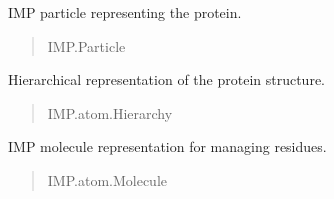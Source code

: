 \documentclass[letterpaper,10pt,english]{sphinxmanual}
\begin{document}
\begin{fulllineitems}
\begin{fulllineitems}
\begin{quote}
\begin{description}
\end{description}\end{quote}

\end{fulllineitems}


\begin{fulllineitems}
\label{\detokenize{src:src.Protein_Class.ProteinStructure.protein}}
\pysigstartsignatures
{}
\pysigstopsignatures
\sphinxAtStartPar
IMP particle representing the protein.
\begin{quote}\begin{description}
\sphinxAtStartPar
IMP.Particle

\end{description}\end{quote}

\end{fulllineitems}


\begin{fulllineitems}
\label{\detokenize{src:src.Protein_Class.ProteinStructure.hier}}
\pysigstartsignatures
{}
\pysigstopsignatures
\sphinxAtStartPar
Hierarchical representation of the protein structure.
\begin{quote}\begin{description}
\sphinxAtStartPar
IMP.atom.Hierarchy

\end{description}\end{quote}

\end{fulllineitems}


\begin{fulllineitems}
\label{\detokenize{src:src.Protein_Class.ProteinStructure.mol}}
\pysigstartsignatures
{}
\pysigstopsignatures
\sphinxAtStartPar
IMP molecule representation for managing residues.
\begin{quote}\begin{description}
\sphinxAtStartPar
IMP.atom.Molecule


\end{description}
\end{quote}
\end{fulllineitems}
\end{fulllineitems}
\end{document}
